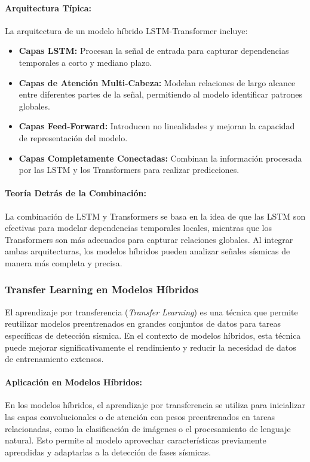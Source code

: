 \paragraph{Arquitectura Típica:}
La arquitectura de un modelo híbrido LSTM-Transformer incluye:
\begin{itemize}
    \item \textbf{Capas LSTM:} Procesan la señal de entrada para capturar dependencias temporales a corto y mediano plazo.
    \item \textbf{Capas de Atención Multi-Cabeza:} Modelan relaciones de largo alcance entre diferentes partes de la señal, permitiendo al modelo identificar patrones globales.
    \item \textbf{Capas Feed-Forward:} Introducen no linealidades y mejoran la capacidad de representación del modelo.
    \item \textbf{Capas Completamente Conectadas:} Combinan la información procesada por las LSTM y los Transformers para realizar predicciones.
\end{itemize}

\paragraph{Teoría Detrás de la Combinación:}
La combinación de LSTM y Transformers se basa en la idea de que las LSTM son efectivas para modelar dependencias temporales locales, mientras que los Transformers son más adecuados para capturar relaciones globales. Al integrar ambas arquitecturas, los modelos híbridos pueden analizar señales sísmicas de manera más completa y precisa.

\subsubsection{Transfer Learning en Modelos Híbridos}

El aprendizaje por transferencia (\textit{Transfer Learning}) es una técnica que permite reutilizar modelos preentrenados en grandes conjuntos de datos para tareas específicas de detección sísmica. En el contexto de modelos híbridos, esta técnica puede mejorar significativamente el rendimiento y reducir la necesidad de datos de entrenamiento extensos.

\paragraph{Aplicación en Modelos Híbridos:}
En los modelos híbridos, el aprendizaje por transferencia se utiliza para inicializar las capas convolucionales o de atención con pesos preentrenados en tareas relacionadas, como la clasificación de imágenes o el procesamiento de lenguaje natural. Esto permite al modelo aprovechar características previamente aprendidas y adaptarlas a la detección de fases sísmicas.

